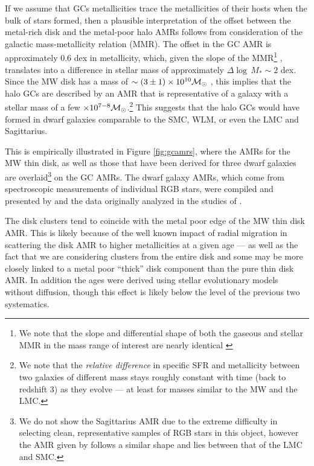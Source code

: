 \documentclass[useAMS,usenatbib]{mn2e}
\newcommand\msol{{{\cal M}_\odot}}
\begin{document}
If we assume that GCs metallicities trace the metallicities of their hosts 
when the bulk of stars formed, then a plausible interpretation of the offset 
between the metal-rich disk and the
metal-poor halo AMRs follows from consideration of the galactic
mass-metallicity relation (MMR).  The offset in the GC AMR is approximately
$0.6$ dex in metallicity, which, given the slope of the MMR\footnote{We note
that the slope and differential shape of both the gaseous and stellar MMR in 
the mass range of interest are nearly identical \citep{Lee08,Kirby11}} 
\citep{Tremonti04,Gallazzi05,Lee06,Kirby11}, translates into a difference in stellar mass
of approximately $\Delta\log\,M_{*} \sim 2$ dex.  
Since the MW disk has a mass of $\sim (3 \pm 1) \times
10^{10} \msol$ \cite{Robin04,McMillan11}, 
this implies that the halo GCs are described by an AMR that is
representative of a galaxy with a stellar mass of a few $\times 10^{7-8} 
\msol$.\footnote{ We note that 
the \textit{relative difference} in
specific SFR \citep{Karim11} and metallicity \citep{Zahid13} 
between two galaxies of different mass stays roughly constant with
time (back to redshift 3) as they evolve --- at least for masses similar to the 
MW and the LMC.}  This
suggests that the halo GCs would have formed in dwarf galaxies comparable to
the SMC, WLM, or even the LMC and Sagittarius.  

This is empirically illustrated in Figure \ref{fig:gcamrs},
where the AMRs for the MW thin disk, as well as those that have been derived for
three dwarf galaxies are overlaid\footnote{We do not show the Sagittarius AMR
due to the extreme difficulty in selecting clean, representative samples of RGB stars
in this object, however the AMR  
given by \cite{Law10} follows a similar shape and lies between
that of the LMC and SMC.} on the GC AMRs.  The dwarf galaxy AMRs, which come from
spectroscopic measurements of individual RGB stars, were compiled and presented by
\cite{Leaman13} and the data originally analyzed in the studies of
\cite{Cole05,Pompeia08,Carrera08,Carrera08b,Leaman09,Parisi10,Leaman12b}.  

The disk clusters tend to coincide 
with the metal poor edge of the MW thin disk AMR.  
This is likely because of the well known impact of
radial migration \citep{Sellwood02,Roskar08} in 
scattering the disk AMR to higher metallicities at
a given age --- as well as the fact that we are considering clusters from the entire disk
and some may be more closely linked to a metal poor ``thick'' disk component
than the pure thin disk AMR.  In addition the \citep{Casagrande11} ages were 
derived using stellar evolutionary models without diffusion, though this effect
is likely below the level of the previous two systematics.  
\end{document}
